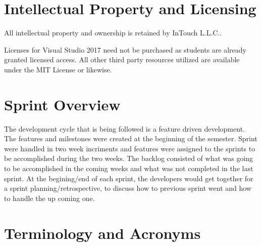 \section{Intellectual Property and Licensing}

All intellectual property and ownership is retained by InTouch L.L.C.. 

Licenses for Visual Studio 2017 need not be purchased as students are already granted licensed access. All other third party resources utilized are available under the MIT License or likewise. 


\section{Sprint  Overview}
The development cycle that is being followed is a feature driven development.
The features and milestones were created at the beginning of the semester.
Sprint were handled in two week incriments and features were assigned to 
the sprints to be accomplished during the two weeks. The backlog consisted
of what was going to be accomplished in the coming weeks and what was not
completed in the last sprint. At the begining/end of each sprint, the 
developers would get together for a sprint planning/retrospective, to discuss
how to previous sprint went and how to handle the up coming one.


\section{Terminology and Acronyms}

